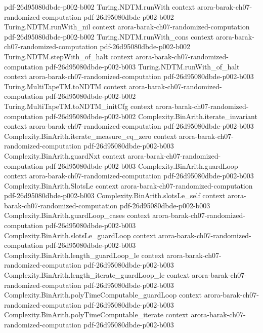 \begin{theorem}
  {pdf-26d95080dbde-p002-b002}
\proofstep
  {Turing.NDTM.runWith}
  {context}
  {arora-barak-ch07-randomized-computation}
  {pdf-26d95080dbde-p002-b002}
\proofstep
  {Turing.NDTM.runWith_nil}
  {context}
  {arora-barak-ch07-randomized-computation}
  {pdf-26d95080dbde-p002-b002}
\proofstep
  {Turing.NDTM.runWith_cons}
  {context}
  {arora-barak-ch07-randomized-computation}
  {pdf-26d95080dbde-p002-b002}
\proofstep
  {Turing.NDTM.stepWith_of_halt}
  {context}
  {arora-barak-ch07-randomized-computation}
  {pdf-26d95080dbde-p002-b003}
\proofstep
  {Turing.NDTM.runWith_of_halt}
  {context}
  {arora-barak-ch07-randomized-computation}
  {pdf-26d95080dbde-p002-b003}
\proofstep
  {Turing.MultiTapeTM.toNDTM}
  {context}
  {arora-barak-ch07-randomized-computation}
  {pdf-26d95080dbde-p002-b002}
\proofstep
  {Turing.MultiTapeTM.toNDTM_initCfg}
  {context}
  {arora-barak-ch07-randomized-computation}
  {pdf-26d95080dbde-p002-b002}
\proofstep
  {Complexity.BinArith.iterate_invariant}
  {context}
  {arora-barak-ch07-randomized-computation}
  {pdf-26d95080dbde-p002-b003}
\proofstep
  {Complexity.BinArith.iterate_measure_eq_zero}
  {context}
  {arora-barak-ch07-randomized-computation}
  {pdf-26d95080dbde-p002-b003}
\proofstep
  {Complexity.BinArith.guardNxt}
  {context}
  {arora-barak-ch07-randomized-computation}
  {pdf-26d95080dbde-p002-b003}
\proofstep
  {Complexity.BinArith.guardLoop}
  {context}
  {arora-barak-ch07-randomized-computation}
  {pdf-26d95080dbde-p002-b003}
\proofstep
  {Complexity.BinArith.SlotsLe}
  {context}
  {arora-barak-ch07-randomized-computation}
  {pdf-26d95080dbde-p002-b003}
\proofstep
  {Complexity.BinArith.slotsLe_self}
  {context}
  {arora-barak-ch07-randomized-computation}
  {pdf-26d95080dbde-p002-b003}
\proofstep
  {Complexity.BinArith.guardLoop_cases}
  {context}
  {arora-barak-ch07-randomized-computation}
  {pdf-26d95080dbde-p002-b003}
\proofstep
  {Complexity.BinArith.slotsLe_guardLoop}
  {context}
  {arora-barak-ch07-randomized-computation}
  {pdf-26d95080dbde-p002-b003}
\proofstep
  {Complexity.BinArith.length_guardLoop_le}
  {context}
  {arora-barak-ch07-randomized-computation}
  {pdf-26d95080dbde-p002-b003}
\proofstep
  {Complexity.BinArith.length_iterate_guardLoop_le}
  {context}
  {arora-barak-ch07-randomized-computation}
  {pdf-26d95080dbde-p002-b003}
\proofstep
  {Complexity.BinArith.polyTimeComputable_guardLoop}
  {context}
  {arora-barak-ch07-randomized-computation}
  {pdf-26d95080dbde-p002-b003}
\proofstep
  {Complexity.BinArith.polyTimeComputable_iterate}
  {context}
  {arora-barak-ch07-randomized-computation}
  {pdf-26d95080dbde-p002-b003}

\end{theorem}
